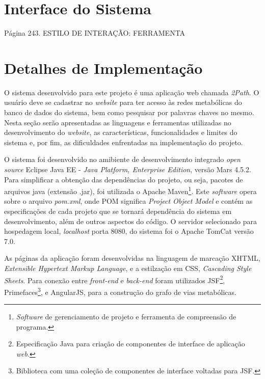 \section{Interface do Sistema}

\indent Página 243. ESTILO DE INTERAÇÃO: FERRAMENTA


\section{Detalhes de Implementação}


\indent O sistema desenvolvido para este projeto é uma aplicação web chamada \textit{2Path}. O usuário deve se cadastrar no \textit{website} para ter acesso às redes metabólicas do banco de dados do sistema, bem como pesquisar por palavras chaves no mesmo. Nesta seção serão apresentadas as linguagens e ferramentas utilizadas no desenvolvimento do \textit{website}, as características, funcionalidades e limites do sistema e, por fim, as dificuldades enfrentadas na implementação do projeto.

\indent O sistema foi desenvolvido no amibiente de desenvolvimento integrado \textit{open source} Eclipse Java EE - \textit{Java Platform, Enterprise Edition}, versão Mars 4.5.2. Para simplificar a obtenção das dependências do projeto, ou seja, pacotes de arquivos java (extensão .jar), foi utilizada o Apache Maven\footnote{\textit{Software} de gerenciamento de projeto e ferramenta de compreensão de programa.}. Este \textit{software} opera sobre o arquivo \textit{pom.xml}, onde POM significa \textit{Project Object Model} e contém as especificações de cada projeto que se tornará dependência do sistema em desenvolvimento, além de outros aspectos do código. O servidor selecionado para hospedagem local, \textit{localhost} porta 8080, do sistema foi o Apache TomCat versão 7.0.

\indent As páginas da aplicação foram desenvolvidas na linguagem de marcação XHTML, \textit{Extensible Hypertext Markup Language}, e a estilzação em CSS, \textit{Cascading Style Sheets}. Para conexão entre \textit{front-end} e \textit{back-end} foram utilizados JSF\footnote{Especificação Java para criação de componentes de interface de aplicação \textit{web}.}, Primefaces\footnote{Biblioteca com uma coleção de componentes de interface voltadas para JSF.}, e AngularJS, para a construção do grafo de vias metabólicas.


